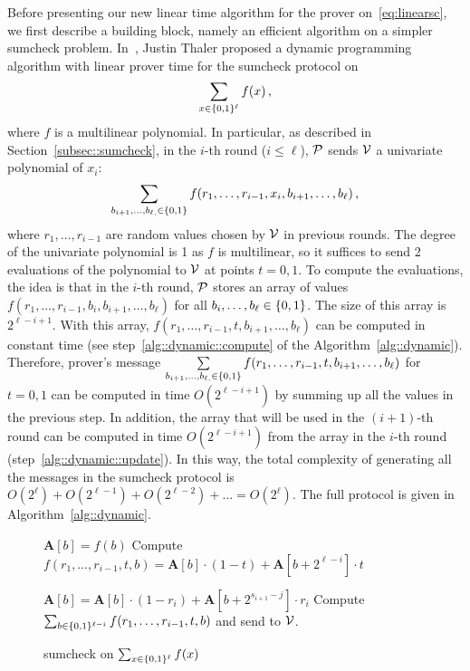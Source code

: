 Before presenting our new linear time algorithm for the prover on~\ref{eq:linearsc}, we first describe a building block, namely an efficient algorithm on a simpler sumcheck problem. In~\cite{t13}, Justin Thaler proposed a dynamic programming algorithm with linear prover time for the sumcheck protocol on $$\sum\limits_{x\in\binary^\ell}f(x)\, ,$$ where $f$ is a multilinear polynomial. In particular, as described in Section~\ref{subsec::sumcheck}, in the $i$-th round ($i\le \ell$), $\P$ sends $\V$ a univariate polynomial of $x_i$: $$\sum\limits_{b_{i+1}, \ldots,b_{\ell, }\in\binary}f(r_1,\ldots, r_{i-1}, x_{i}, b_{i+1},\ldots, b_{\ell})\, ,$$ where $r_1, \ldots, r_{i-1}$ are random values chosen by $\V$ in previous rounds. The degree of the univariate polynomial is 1 as $f$ is multilinear, so it suffices to send 2 evaluations of the polynomial to $\V$ at points $t = 0,1$. To compute the evaluations, the idea is that in the $i$-th round, $\P$ stores an array of values $f(r_1,\ldots, r_{i-1}, b_{i}, b_{i+1},\ldots, b_{\ell})$ for all $b_i,\ldots,b_\ell\in\binary$. The size of this array is $2^{\ell-i+1}$. With this array, $f(r_1,\ldots, r_{i-1}, t, b_{i+1},\ldots, b_{\ell})$ can be computed in constant time (see step~\ref{alg::dynamic::compute} of the Algorithm~\ref{alg::dynamic}). Therefore, prover's message $\sum\limits_{b_{i+1}, \ldots,b_{\ell, }\in\binary}f(r_1,\ldots, r_{i-1}, t, b_{i+1},\ldots, b_{\ell})$ for $t=0,1$ can be computed in time $O(2^{\ell-i+1})$ by summing up all the values in the previous step. In addition, the array that will be used in the $(i+1)$-th round can be computed in time $O(2^{\ell-i+1})$ from the array in the $i$-th round (step~\ref{alg::dynamic::update}).  In this way, the total complexity of generating all the messages in the sumcheck protocol is $O(2^{\ell})+ O(2^{\ell-1}) + O(2^{\ell-2}) + \ldots = O(2^\ell)$. The full protocol is given in Algorithm~\ref{alg::dynamic}. 



\begin{figure}[ht!]
	\begin{algorithm}[H]
		\caption{sumcheck on $\sum_{x\in\binary^\ell}f(x)$}\label{alg::dynamic}
		\begin{algorithmic}[1]
			\State $\textbf{A}[b] = f(b)$ 
			\EndFor
			\EndProcedure
			 
					\State\label{alg::dynamic::compute} Compute $f(r_1,\ldots, r_{i-1}, t, b) = \textbf{A}[b]\cdot(1-t)+\textbf{A}[b+2^{\ell-i}]\cdot t$
					\EndFor
					
					\State\label{alg::dynamic::update} $\textbf{A}[b]=\textbf{A}[b]\cdot(1-r_i)+\textbf{A}[b+2^{s_{i+1}-j}]\cdot r_i$
				\EndFor
					\State\label{alg::dynamic::sum} Compute $\sum_{b\in\binary^{\ell-i}}f(r_1,\ldots, r_{i-1}, t, b)$ and send to $\V$.
				\EndFor
			\EndFor
			\EndProcedure
		\end{algorithmic}
	\end{algorithm}
\end{figure}

